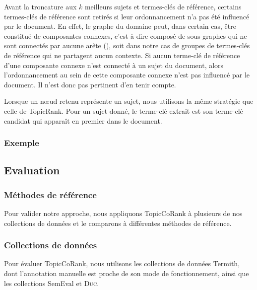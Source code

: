         Avant la troncature aux $k$ meilleurs sujets et termes-clés de
        référence, certains termes-clés de référence sont retirés si leur
        ordonnancement n'a pas été influencé par le document. En effet, le
        graphe du domaine peut, dans certain cas, être constitué de composantes
        connexes, c'est-à-dire composé de sous-graphes qui ne sont connectés par
        aucune arête (), soit dans notre cas de groupes de
        termes-clés de référence qui ne partagent aucun contexte. Si aucun
        terme-clé de référence d'une composante connexe n'est connecté à un
        sujet du document, alors l'ordonnancement au sein de cette composante
        connexe n'est pas influencé par le document. Il n'est donc pas pertinent
        d'en tenir compte.

        Lorsque un n\oe{}ud retenu représente un sujet, nous utilisons la même
        stratégie que celle de TopicRank. Pour un sujet donné, le terme-clé
        extrait est son terme-clé candidat qui apparaît en premier dans le
        document.

      \subsubsection{Exemple}
      \label{subsubsec:main-automatic_keyphrase_annotation-supervised_automatic_keyphrase_extraction-topiccorank-exemple}
        \TODO{\dots}

    \subsection{Evaluation}
    \label{subsec:main-automatic_keyphrase_annotation-supervised_automatic_keyphrase_annotation-evaluation}
      \subsubsection{Méthodes de référence}
      \label{subsubsec:main-automatic_keyphrase_annotation-supervised_automatic_keyphrase_annotation-evaluation-baselines}
        Pour valider notre approche, nous appliquons TopicCoRank à plusieurs de
        nos collections de données et le comparons à différentes méthodes de
        référence. 

      \subsubsection{Collections de données}
      \label{subsubsec:main-automatic_keyphrase_annotation-supervised_automatic_keyphrase_annotation-evaluation-evaluation_data}
        Pour évaluer TopicCoRank, nous utilisons les collections de données
        Termith, dont l'annotation manuelle est proche de son mode de
        fonctionnement, ainsi que les collections SemEval et \textsc{Duc}.
        
